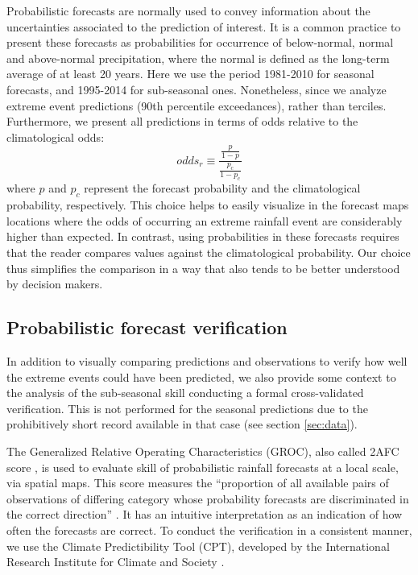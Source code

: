 \documentclass[twocol]{ametsoc}
\begin{document}
Probabilistic forecasts are normally used to convey information about the uncertainties associated to the prediction of interest.
It is a common practice to present these forecasts as probabilities for occurrence of below-normal, normal and above-normal precipitation, where the normal is defined as the long-term average of at least 20 years.
Here we use the period 1981-2010 for seasonal forecasts, and 1995-2014 for sub-seasonal ones.
Nonetheless, since we analyze extreme event predictions (90th percentile exceedances), rather than terciles.
Furthermore, we present all predictions in terms of odds relative to the climatological odds:
\begin{equation}
odds_{r} \equiv \frac{\frac{p}{1-p}}{\frac{p_c}{1-p_c}}
\end{equation}
where $p$ and $p_c$ represent the forecast probability and the climatological probability, respectively.
This choice helps to easily visualize in the forecast maps locations where the odds of occurring an extreme rainfall event are considerably higher than expected.
In contrast, using probabilities in these forecasts requires that the reader compares values against the climatological probability.
Our choice thus simplifies the comparison in a way that  also tends to be better understood by decision makers.

\subsection{Probabilistic forecast verification}

In addition to visually comparing predictions and observations to verify how well the extreme events could have been predicted, we also provide some context to the analysis of the sub-seasonal skill conducting a formal cross-validated verification.
This is not performed for the seasonal predictions due to the prohibitively short record available in that case (see section \ref{sec:data}).

The Generalized Relative Operating Characteristics (GROC), also called 2AFC score \citep{Mason:2009kr}, is used to evaluate skill of probabilistic rainfall forecasts at a local scale, via spatial maps.
This score measures the ``proportion of all available pairs of observations of differing category whose probability forecasts are discriminated in the correct direction'' \citep{Mason:2009kr}.
It has an intuitive interpretation as an indication of how often the forecasts are correct.
To conduct the verification in a consistent manner, we use the Climate Predictibility Tool (CPT), developed by the International Research Institute for Climate and Society \citep{Mason:2017gg}.
\end{document}
